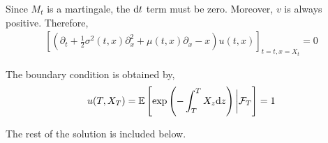 \begin{solution}
    Since \( M_t \) is a martingale, the \( \mathrm{d} t \) term must be zero. Moreover, \( v \) is always positive. Therefore,
    \begin{align*}
        \left[ \left( \partial_t + \frac{1}{2}\sigma^2(t,x) \partial_x^2 + \mu(t,x) \partial_x - x \right)u(t,x) \right]_{t=t,x=X_t} = 0
    \end{align*}
    
    The boundary condition is obtained by,
    \begin{align*}
        u(T,X_T) = \mathbb{E} \left[ \exp \left( -\int_T^T X_z\mathrm{d} z \right) \bigg| \mathcal{F}_T \right] = 1
    \end{align*}
    
    The rest of the solution is included below.
\end{solution}



